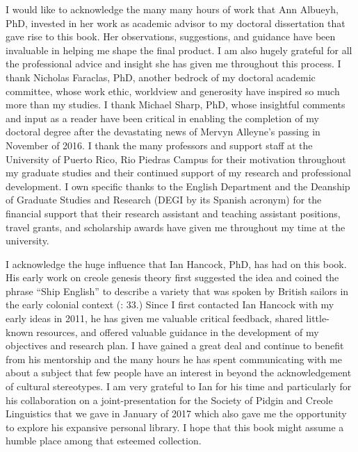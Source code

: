 I would like to acknowledge the many many hours of work that Ann Albueyh, PhD, invested in her work as academic advisor to my doctoral dissertation that gave rise to this book. Her observations, suggestions, and guidance have been invaluable in helping me shape the final product. I am also hugely grateful for all the professional advice and insight she has given me throughout this process. I thank Nicholas Faraclas, PhD, another bedrock of my doctoral academic committee, whose work ethic, worldview and generosity have inspired so much more than my studies. I thank Michael Sharp, PhD, whose insightful comments and input as a reader have been critical in enabling the completion of my doctoral degree after the devastating news of Mervyn Alleyne’s passing in November of 2016. I thank the many professors and support staff at the University of Puerto Rico, Rio Piedras Campus for their motivation throughout my graduate studies and their continued support of my research and professional development. I own specific thanks to the English Department and the Deanship of Graduate Studies and Research (DEGI by its Spanish acronym) for the financial support that their research assistant and teaching assistant positions, travel grants, and scholarship awards have given me throughout my time at the university.

I acknowledge the huge influence that Ian Hancock, PhD, has had on this book. His early work on creole genesis theory first suggested the idea and coined the phrase “Ship English” to describe a variety that was spoken by British sailors in the early colonial context (\citealt{Hancock1976}: 33.) Since I first contacted Ian Hancock with my early ideas in 2011, he has given me valuable critical feedback, shared little-known resources, and offered valuable guidance in the development of my objectives and research plan. I have gained a great deal and continue to benefit from his mentorship and the many hours he has spent communicating with me about a subject that few people have an interest in beyond the acknowledgement of cultural stereotypes. I am very grateful to Ian for his time and particularly for his collaboration on a joint-presentation for the Society of Pidgin and Creole Linguistics that we gave in January of 2017 which also gave me the opportunity to explore his expansive personal library. I hope that this book might assume a humble place among that esteemed collection. 

